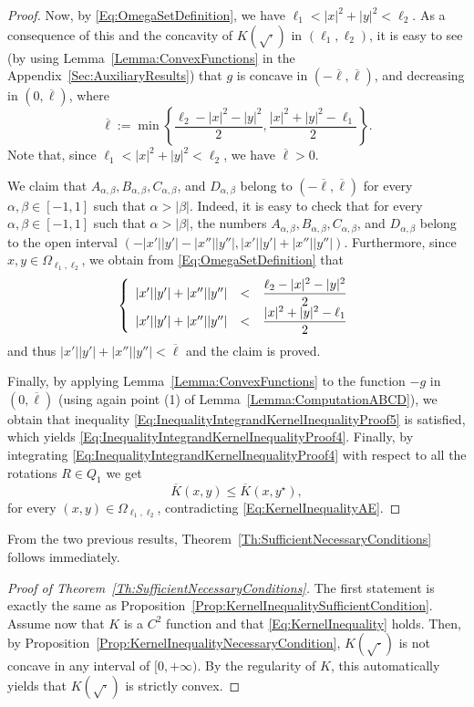\begin{proof}
Now, by \eqref{Eq:OmegaSetDefinition}, we have $\ell_1 < |x|^2+|y|^2 <\ell_2$. As a consequence of this and the concavity of $K(\sqrt{\cdot})$ in $(\ell_1,\ell_2)$, it is easy to see (by using Lemma~\ref{Lemma:ConvexFunctions} in the Appendix~\ref{Sec:AuxiliaryResults}) that $g$ is concave in $ \left( -\overline{\ell}, \overline{\ell}\right) $, and decreasing in $(0,\overline{\ell})$, where 
$$
\overline{\ell} := \min{\left\{\frac{\ell_2-|x|^2-|y|^2}{2},\frac{|x|^2+|y|^2-\ell_1}{2}\right\}}.$$
Note that, since $\ell_1 < |x|^2+|y|^2 <\ell_2$, we have $\overline{\ell}>0$.


We claim that $A_{\alpha,\beta}, B_{\alpha,\beta}, C_{\alpha,\beta}$, and $D_{\alpha,\beta}$ belong to $(-\overline{\ell},\overline{\ell})$ for every $\alpha, \beta \in [-1,1]$ such that $\alpha>|\beta|$. Indeed, it is easy to check that for every $\alpha, \beta \in [-1,1]$ such that $\alpha>|\beta|$, the numbers $A_{\alpha,\beta}, B_{\alpha,\beta}, C_{\alpha,\beta}$, and $D_{\alpha,\beta}$ belong to the open interval $(-|x'||y'|-|x''||y''|,|x'||y'|+|x''||y''|)$. Furthermore, since $x,y \in \Omega_{\ell_1,\ell_2}$, we obtain from \eqref{Eq:OmegaSetDefinition} that
$$
\left\{\begin{array}{rcll}
|x'||y'|+|x''||y''|&<&\dfrac{\ell_2-|x|^2-|y|^2}{2}\\
|x'||y'|+|x''||y''|&<&\dfrac{|x|^2+|y|^2-\ell_1}{2}
\end{array} \right. 
$$
and thus $ |x'||y'|+|x''||y''|<\overline{\ell}$ and the claim is proved.

Finally, by applying Lemma~\ref{Lemma:ConvexFunctions} to the function $-g$ in $(0,\overline{\ell})$ (using again  point (1) of Lemma~\ref{Lemma:ComputationABCD}), we obtain that inequality \eqref{Eq:InequalityIntegrandKernelInequalityProof5} is satisfied, which yields \eqref{Eq:InequalityIntegrandKernelInequalityProof4}. Finally, by integrating \eqref{Eq:InequalityIntegrandKernelInequalityProof4} with respect to all the rotations $R\in Q_1$ we get $$ \overline{K}(x,y) \leq \overline{K}(x, y^\star),$$ for every $(x,y)\in \Omega_{\ell_1,\ell_2}$, contradicting \eqref{Eq:KernelInequalityAE}.
\end{proof}

From the two previous results, Theorem~\ref{Th:SufficientNecessaryConditions} follows immediately.

\begin{proof}[Proof of Theorem~\ref{Th:SufficientNecessaryConditions}]
	The first statement is exactly the same as Proposition~\ref{Prop:KernelInequalitySufficientCondition}. Assume now that $K$ is a $C^2$ function and that \eqref{Eq:KernelInequality} holds. Then, by Proposition~\ref{Prop:KernelInequalityNecessaryCondition}, $K(\sqrt{\cdot})$ is not concave in any interval of $[0,+\infty)$. By the regularity of $K$, this automatically yields that $K(\sqrt{\cdot})$ is strictly convex.
\end{proof}

